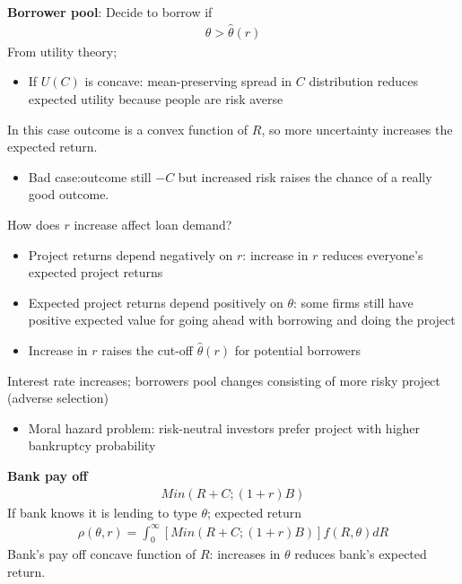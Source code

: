 \documentclass{beamer}
\begin{document}
\begin{frame}
\textbf{Borrower pool}: Decide to borrow if
\begin{align}
  \theta > \hat{\theta}(r)
\end{align}
\medskip
From utility theory;
\begin{itemize}
  \item If $U(C)$ is concave: mean-preserving spread in $C$ distribution reduces expected utility because people are risk averse
\end{itemize}
\medskip
In this case outcome is a convex function of $R$, so more uncertainty increases the expected return. 
\begin{itemize}
  \item Bad case:outcome still $−C$ but increased risk raises the chance of a really good outcome.
\end{itemize}
\end{frame}

\begin{frame}
 How does $r$ increase affect loan demand?  
\begin{itemize}
  \item Project returns depend negatively on $r$: increase in $r$ reduces everyone's expected project returns  
  \item Expected project returns depend positively on $\theta$: some firms still have positive expected value for
    going ahead with borrowing and doing the project
  \item Increase in $r$ raises the cut-off $\hat{\theta}(r)$ for potential borrowers
\end{itemize}
\medskip
 Interest rate increases; borrowers pool changes consisting of more risky project (adverse selection)
 \begin{itemize}
   \item Moral hazard problem: risk-neutral investors prefer project with higher bankruptcy probability
 \end{itemize}
\end{frame}

\begin{frame}
\textbf{Bank pay off}
\begin{align}
  Min(R+C;(1+r)B)
\end{align}
 If bank knows it is lending to type $\theta$; expected return
\begin{align}
  \rho(\theta,r)=\int_0^{\infty}[Min(R+C;(1+r)B)]f(R,\theta)dR
\end{align}
 \medskip
 Bank's pay off concave function of $R$: increases in $\theta$ reduces bank's expected return.
\end{frame}
\end{document}
